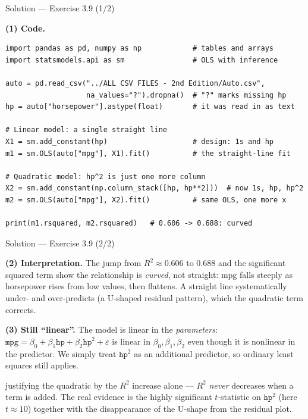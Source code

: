 \documentclass[aspectratio=169,11pt]{beamer}
\begin{document}
\begin{frame}[fragile]{Solution --- Exercise 3.9 (1/2)}
  \begin{solutionbox}
    \textbf{(1) Code.}
    \vspace{-2mm}
\begin{lstlisting}
import pandas as pd, numpy as np            # tables and arrays
import statsmodels.api as sm                # OLS with inference

auto = pd.read_csv("../ALL CSV FILES - 2nd Edition/Auto.csv",
                   na_values="?").dropna()  # "?" marks missing hp
hp = auto["horsepower"].astype(float)       # it was read in as text

# Linear model: a single straight line
X1 = sm.add_constant(hp)                    # design: 1s and hp
m1 = sm.OLS(auto["mpg"], X1).fit()          # the straight-line fit

# Quadratic model: hp^2 is just one more column
X2 = sm.add_constant(np.column_stack([hp, hp**2]))  # now 1s, hp, hp^2
m2 = sm.OLS(auto["mpg"], X2).fit()          # same OLS, one more x

print(m1.rsquared, m2.rsquared)   # 0.606 -> 0.688: curved
\end{lstlisting}
  \end{solutionbox}
\end{frame}

\begin{frame}{Solution --- Exercise 3.9 (2/2)}
  \begin{solutionbox}
    \textbf{(2) Interpretation.} The jump from $R^2\approx 0.606$ to
    $0.688$ and the significant squared term show the relationship is
    \emph{curved}, not straight: mpg falls steeply as horsepower rises
    from low values, then flattens. A straight line systematically
    under- and over-predicts (a U-shaped residual pattern), which the
    quadratic term corrects.

    \textbf{(3) Still ``linear''.} The model is linear in the
    \emph{parameters}: $\texttt{mpg}=\beta_0+\beta_1\texttt{hp}
    +\beta_2\texttt{hp}^2+\varepsilon$ is linear in
    $\beta_0,\beta_1,\beta_2$ even though it is nonlinear in the
    predictor. We simply treat $\texttt{hp}^2$ as an additional
    predictor, so ordinary least squares still applies.
  \end{solutionbox}
  \begin{mistake}
    justifying the quadratic by the $R^2$
    increase alone --- $R^2$ \emph{never} decreases when a term is
    added. The real evidence is the highly significant $t$-statistic
    on $\texttt{hp}^2$ (here $t\approx 10$) together with the
    disappearance of the U-shape from the residual plot.
  \end{mistake}
\end{frame}
\end{document}
